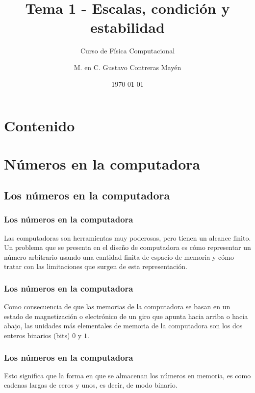  



\title{\large{Tema 1 - Escalas, condición y estabilidad}}
\subtitle{Curso de Física Computacional}
\author[]{M. en C. Gustavo Contreras Mayén}
\date{\today}

\maketitle
\section*{Contenido}
\fontsize{14}{14}\selectfont
{}
\section{Números en la computadora}
\subsection{Los números en la computadora}
\begin{frame}
\frametitle{Los números en la computadora}
Las computadoras son herramientas muy poderosas, pero tienen un alcance finito.
\\
\bigskip
Un problema que se presenta en el diseño de computadora es cómo representar un número arbitrario usando una cantidad finita de espacio de memoria y cómo tratar con las limitaciones que surgen de esta representación.
\end{frame}
\begin{frame}
\frametitle{Los números en la computadora}
Como consecuencia de que las memorias de la computadora se basan en un estado de magnetización o electrónico de un giro que apunta hacia arriba o hacia abajo, las unidades más elementales de memoria de la computadora son los dos enteros binarios (bits) $0$ y $1$.
\end{frame}
\begin{frame}
\frametitle{Los números en la computadora}
Esto significa que la forma en que se almacenan los números en memoria, es como cadenas largas de ceros y unos, es decir, de modo binario.
\end{frame}

